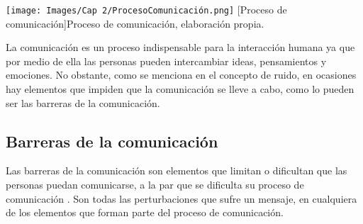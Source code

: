 \begin{center}
    \texttt{[image: Images/Cap 2/ProcesoComunicación.png]}
    [Proceso de comunicación]{Proceso de comunicación, elaboración propia.} 
\end{center}

La comunicación es un proceso indispensable para la interacción humana ya que por medio de ella las personas pueden intercambiar ideas, pensamientos y emociones. No obstante, como se menciona en el concepto de ruido, en ocasiones hay elementos que impiden que la comunicación se lleve a cabo, como lo pueden ser las barreras de la comunicación.

\newpage
\subsection{Barreras de la comunicación}
Las barreras de la comunicación son elementos que limitan o dificultan que las personas puedan comunicarse, a la par que se dificulta su proceso de comunicación \cite{ref2}. Son todas las perturbaciones que sufre un mensaje, en cualquiera de los elementos que forman parte del proceso de comunicación.\\

